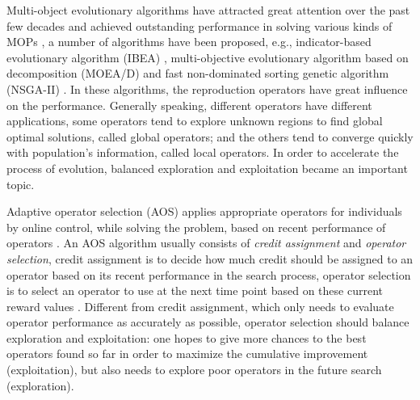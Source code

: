\documentclass[journal]{IEEEtran}
\begin{document}
Multi-object evolutionary algorithms have attracted great attention over the past few decades and achieved outstanding performance in solving various kinds of MOPs \cite{fialho2010adaptive},
a number of algorithms have been proposed, e.g., indicator-based evolutionary algorithm (IBEA) \cite{IBEA}, multi-objective evolutionary algorithm based on decomposition (MOEA/D) \cite{moead} and fast non-dominated sorting genetic algorithm (NSGA-II) \cite{nsga2}.
In these algorithms, the reproduction operators have great influence on the performance.
Generally speaking, different operators have different applications, some operators tend to explore unknown regions to find global optimal solutions, called global operators; and the others tend to converge quickly with population's information, called local operators.
In order to accelerate the process of evolution, balanced exploration and exploitation became an important topic.

Adaptive operator selection (AOS) applies appropriate operators for individuals by online control, while solving the problem, based on recent performance of operators \cite{li2011multi}.
An AOS algorithm usually consists of \textit{credit assignment} and \textit{operator selection}, credit assignment is to decide how much credit should be assigned to an operator based on its recent performance in the search process, operator selection is to select an operator to use at the next time point based on these current reward values \cite{frrmab}.
Different from credit assignment, which only needs to evaluate operator performance as accurately as possible, operator selection should balance exploration and exploitation: one hopes to give more chances to the best operators found so far in order to maximize the cumulative improvement (exploitation), but also needs to explore poor operators in the future search (exploration).
\end{document}
